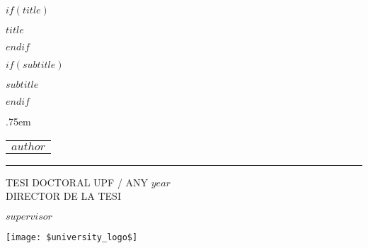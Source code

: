 {{{{{{{%




\frenchspacing
\raggedbottom
\pagestyle{plain}

\begin{titlepage}
  \makeatletter
  \let\footnotesize\small
  \let\footnoterule\relax
  \let \footnote \thanks
  \null\vfil
  \begin{flushleft}%
    $if(title)$
    {\LARGE \sffamily $title$ \par}
    $endif$

    \vspace*{2cm}
    $if(subtitle)$
    {\Large \sffamily $subtitle$ \par}%
    \vskip 2cm%
    $endif$
    {\large
     \lineskip .75em%
      \begin{tabular}[t]{c}%
       {\Huge $author$}
      \end{tabular}\par}%
      \rule{\linewidth}{1mm} \par
      \vskip 1cm%
    {\large TESI DOCTORAL UPF / ANY $year$}\\[2cm]
    {\normalsize DIRECTOR DE LA TESI}\par
    {\large $supervisor$}  \par
    \vspace{3cm}
   \centering
    \texttt{[image: \$university\_logo\$]}
   \end{flushleft}\par
   \makeatother
\end{titlepage}

}}}}}}}
